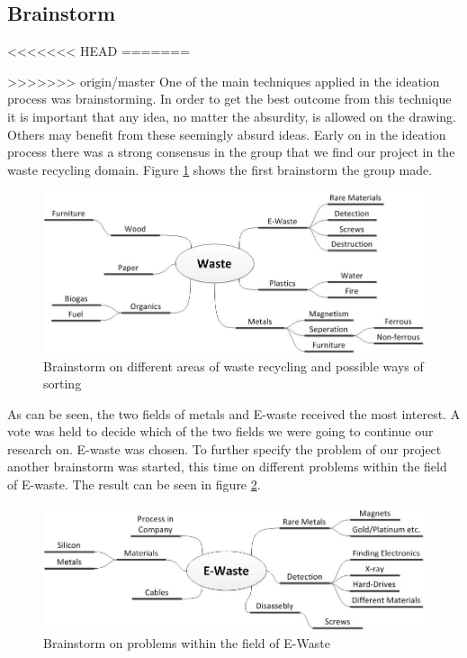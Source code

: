\subsection{Brainstorm}
<<<<<<< HEAD
=======

>>>>>>> origin/master
One of the main techniques applied in the ideation process was brainstorming. In order to get the best outcome from this technique it is important that any idea, no matter the absurdity, is allowed on the drawing. Others may benefit from these seemingly absurd ideas. Early on in the ideation process there was a strong consensus in the group that we find our project in the waste recycling domain. Figure \ref{fig:wasteTypesBrainstorm} shows the first brainstorm the group made.

\begin{figure}[!ht]
	\centering
	\includegraphics[scale=.5]{./graphics/wasteTypesBrainstorm.jpg}
	\caption{Brainstorm on different areas of waste recycling and possible ways of sorting}
	\label{fig:wasteTypesBrainstorm}
\end{figure}

As can be seen, the two fields of metals and E-waste received the most interest. A vote was held to decide which of the two fields we were going to continue our research on. E-waste was chosen. To further specify the problem of our project another brainstorm was started, this time on different problems within the field of E-waste. The result can be seen in figure \ref{fig:EWasteBrainstorm}.

\begin{figure}[!ht]
	\centering
	\includegraphics[scale=.5]{./graphics/EWasteBrainstorm.jpg}
	\caption{Brainstorm on problems within the field of E-Waste}
	\label{fig:EWasteBrainstorm}
\end{figure}

